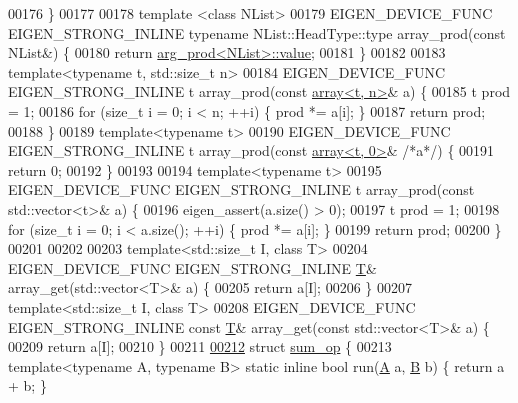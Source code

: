 \begin{DoxyCode}
00176 \}
00177 
00178 \textcolor{keyword}{template} <\textcolor{keyword}{class} NList>
00179 EIGEN\_DEVICE\_FUNC EIGEN\_STRONG\_INLINE \textcolor{keyword}{typename} NList::HeadType::type array\_prod(\textcolor{keyword}{const} NList&) \{
00180   \textcolor{keywordflow}{return} \hyperlink{struct_eigen_1_1internal_1_1arg__prod}{arg\_prod<NList>::value};
00181 \}
00182 
00183 \textcolor{keyword}{template}<\textcolor{keyword}{typename} t, std::\textcolor{keywordtype}{size\_t} n>
00184 EIGEN\_DEVICE\_FUNC EIGEN\_STRONG\_INLINE t array\_prod(\textcolor{keyword}{const} \hyperlink{class_eigen_1_1array}{array<t, n>}& a) \{
00185   t prod = 1;
00186   \textcolor{keywordflow}{for} (\textcolor{keywordtype}{size\_t} i = 0; i < n; ++i) \{ prod *= a[i]; \}
00187   \textcolor{keywordflow}{return} prod;
00188 \}
00189 \textcolor{keyword}{template}<\textcolor{keyword}{typename} t>
00190 EIGEN\_DEVICE\_FUNC EIGEN\_STRONG\_INLINE t array\_prod(\textcolor{keyword}{const} \hyperlink{class_eigen_1_1array}{array<t, 0>}& \textcolor{comment}{/*a*/}) \{
00191   \textcolor{keywordflow}{return} 0;
00192 \}
00193 
00194 \textcolor{keyword}{template}<\textcolor{keyword}{typename} t>
00195 EIGEN\_DEVICE\_FUNC EIGEN\_STRONG\_INLINE t array\_prod(\textcolor{keyword}{const} std::vector<t>& a) \{
00196   eigen\_assert(a.size() > 0);
00197   t prod = 1;
00198   \textcolor{keywordflow}{for} (\textcolor{keywordtype}{size\_t} i = 0; i < a.size(); ++i) \{ prod *= a[i]; \}
00199   \textcolor{keywordflow}{return} prod;
00200 \}
00201 
00202 
00203 \textcolor{keyword}{template}<std::\textcolor{keywordtype}{size\_t} I, \textcolor{keyword}{class} T>
00204 EIGEN\_DEVICE\_FUNC EIGEN\_STRONG\_INLINE \hyperlink{group___sparse_core___module}{T}& array\_get(std::vector<T>& a) \{
00205   \textcolor{keywordflow}{return} a[I];
00206 \}
00207 \textcolor{keyword}{template}<std::\textcolor{keywordtype}{size\_t} I, \textcolor{keyword}{class} T>
00208 EIGEN\_DEVICE\_FUNC EIGEN\_STRONG\_INLINE \textcolor{keyword}{const} \hyperlink{group___sparse_core___module}{T}& array\_get(\textcolor{keyword}{const} std::vector<T>& a) \{
00209   \textcolor{keywordflow}{return} a[I];
00210 \}
00211 
\hyperlink{struct_eigen_1_1internal_1_1sum__op}{00212} \textcolor{keyword}{struct }\hyperlink{struct_eigen_1_1internal_1_1sum__op}{sum\_op} \{
00213   \textcolor{keyword}{template}<\textcolor{keyword}{typename} A, \textcolor{keyword}{typename} B> \textcolor{keyword}{static} \textcolor{keyword}{inline} \textcolor{keywordtype}{bool} run(\hyperlink{group___core___module_class_eigen_1_1_matrix}{A} a, \hyperlink{group___core___module_class_eigen_1_1_matrix}{B} b) \{ \textcolor{keywordflow}{return} a + b; \}

\end{DoxyCode}
